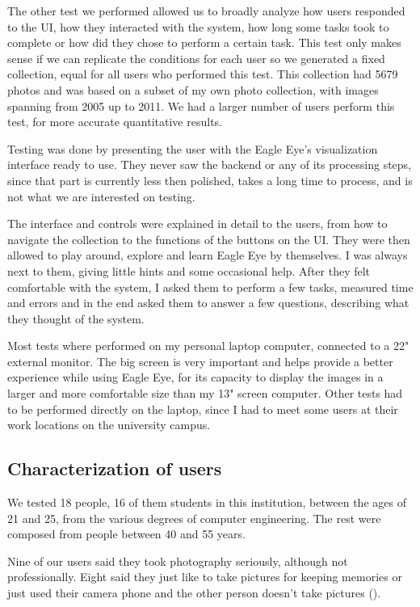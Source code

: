 {The other test we performed allowed us to broadly analyze how users responded to the \ac{UI}, how they interacted with the system, how long some tasks took to complete or how did they chose to perform a certain task. This test only makes sense if we can replicate the conditions for each user so we generated a fixed collection, equal for all users who performed this test. This collection had 5679 photos and was based on a subset of my own photo collection, with images spanning from 2005 up to 2011. We had a larger number of users perform this test, for more accurate quantitative results.

Testing was done by presenting the user with the Eagle Eye's visualization interface ready to use. They never saw the backend or any of its processing steps, since that part is currently less then polished, takes a long time to process, and is not what we are interested on testing.

The interface and controls were explained in detail to the users, from how to navigate the collection to the functions of the buttons on the \ac{UI}. They were then allowed to play around, explore and learn Eagle Eye by themselves. I was always next to them, giving little hints and some occasional help. After they felt comfortable with the system, I asked them to perform a few tasks, measured time and errors and in the end asked them to answer a few questions, describing what they thought of the system.

Most tests where performed on my personal laptop computer, connected to a 22" external monitor. The big screen is very important and helps provide a better experience while using Eagle Eye, for its capacity to display the images in a larger and more comfortable size than my 13" screen computer. Other tests had to be performed directly on the laptop, since I had to meet some users at their work locations on the university campus.





\subsection{Characterization of users}

We tested 18 people, 16 of them students in this institution, between the ages of 21 and 25, from the various degrees of computer engineering. The rest were composed from people between 40 and 55 years.

Nine of our users said they took photography seriously, although not professionally. Eight said they just like to take pictures for keeping memories or just used their camera phone and the other person doesn't take pictures ().

}
